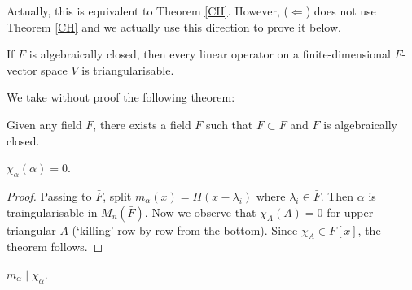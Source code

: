 \documentclass{scrartcl}
\begin{document}
\begin{remark}
	Actually, this is equivalent to Theorem \ref{CH}. However, ($\Leftarrow$) does not use Theorem \ref{CH} and we actually use this direction to prove it below. 
\end{remark}
\begin{corollary}
	If $F$ is algebraically closed, then every linear operator on a finite-dimensional $F$-vector space $V$ is triangularisable. 
\end{corollary}
We take without proof the following theorem:
\begin{theorem}
	Given any field $F$, there exists a field $\bar{F}$ such that $F \subset \bar{F}$ and $\bar{F}$ is algebraically closed. 
\end{theorem}

\begin{theorem} \label{CH}
	$\chi_\alpha(\alpha) = 0$.
\end{theorem}
\begin{proof}
	Passing to $\bar{F}$, split $m_\alpha(x) = \Pi (x-\lambda_i)$ where $\lambda_i \in \bar{F}$. Then $\alpha$ is traingularisable in $M_n(\bar{F})$. Now we observe that $\chi_A(A) = 0$ for upper triangular $A$ (`killing' row by row from the bottom). Since $\chi_A \in F[x]$, the theorem follows. 
\end{proof}
\begin{corollary}
	$m_\alpha \mid \chi_\alpha$. 
\end{corollary}
\end{document}
